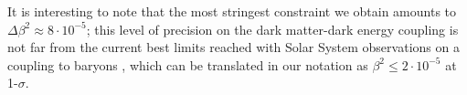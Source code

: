 It is interesting to note that the most stringest constraint we obtain
amounts to $\Delta\beta^{2}\approx8\cdot10^{-5}$; this level of precision
on the dark matter-dark energy coupling is not far from the current
best limits reached with Solar System observations on a coupling to
baryons \cite{Agashe:2014kda}, which can be translated in our notation
as $\beta^{2}\le2\cdot10^{-5}$ at 1-$\sigma$. 




%
%
%
%
%
